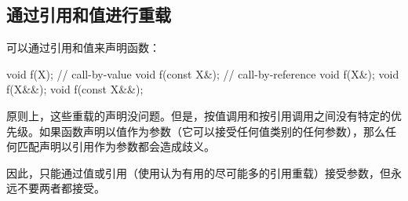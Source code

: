 \subsection{通过引用和值进行重载}

可以通过引用和值来声明函数：

\begin{cppcode}
void f(X); // call-by-value
void f(const X&); // call-by-reference
void f(X&);
void f(X&&);
void f(const X&&);
\end{cppcode}

原则上，这些重载的声明没问题。但是，按值调用和按引用调用之间没有特定的优先级。如果函数声明以值作为参数（它可以接受任何值类别的任何参数），那么任何匹配声明以引用作为参数都会造成歧义。

因此，只能通过值或引用（使用认为有用的尽可能多的引用重载）接受参数，但永远不要两者都接受。


































































